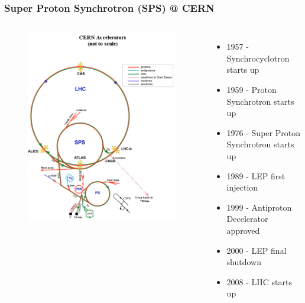 \documentclass[xcolor=table]{beamer}
\begin{document}
\begin{frame}
\frametitle{Super Proton Synchrotron (SPS) @ CERN}
\fontsize{7pt}{12}\selectfont

\begin{columns}


\begin{figure}[h]
\centering
\includegraphics[height=0.8\textheight]{images/sps.png}
\end{figure} 

\begin{itemize}
\item 1957 - Synchrocyclotron starts up
\item 1959 - Proton Synchrotron starts up
\item 1976 - Super Proton Synchrotron starts up
\item 1989 - LEP first injection
\item 1999 - Antiproton Decelerator approved
\item 2000 - LEP final shutdown
\item 2008 - LHC starts up
\end{itemize}

\end{columns}


\end{frame}
\end{document}
